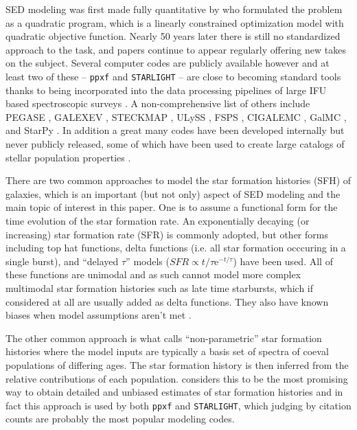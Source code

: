 \documentclass[modern]{aastex62}
\begin{document}
SED modeling was first made fully quantitative by \citet{1972A&A....20..361F} who formulated the problem as a quadratic program, which is a linearly constrained optimization model with quadratic objective function. Nearly 50 years later there is still no standardized approach to the task, and papers continue to appear regularly offering new takes on the subject. Several computer codes are publicly available however and at least two of these -- \texttt{ppxf} \citep{2004PASP..116..138C, 2017MNRAS.466..798C} and \texttt{STARLIGHT} \citep{2005MNRAS.358..363C} -- are close to becoming standard tools thanks to being incorporated into the data processing pipelines of large IFU based spectroscopic surveys \citep{2016AJ....152...83L, fernandes_et_al._2014}. A non-comprehensive list of others include PEGASE \citep{1997A&A...326..950F, 1999astro.ph.12179F}, GALEXEV \citep{2003MNRAS.344.1000B}, STECKMAP \citep{2006MNRAS.365...46O, 2006MNRAS.365...74O, 2011arXiv1108.4631O}, ULySS \citep{2009A&A...501.1269K}, FSPS \citep{2009ApJ...699..486C, 2010ApJ...712..833C}, CIGALEMC \citep{2011ApJ...740...22S}, GalMC \citep{2011ApJ...737...47A}, and StarPy \citep{2016ascl.soft09002S, 2015MNRAS.450..435S}. In addition a great many codes have been developed internally but never publicly released, some of which have been used to create large catalogs of stellar population properties \citep{2004astro.ph..6220B, 2007MNRAS.381.1252T, 2009ApJS..185....1T}.

There are two common approaches to model the star formation histories (SFH) of galaxies, which is an important (but not only) aspect of SED modeling and the main topic of interest in this paper. One is to assume a functional form for the time evolution of the star formation rate. An exponentially decaying (or increasing) star formation rate (SFR) is commonly adopted, but other forms including top hat functions, delta functions (i.e. all star formation occcuring in a single burst), and ``delayed $\tau$'' models ($SFR \propto t/\tau \mathrm{e}^{-t/\tau}$) have been used. All of these functions are unimodal and as such cannot model more complex multimodal star formation histories such as late time starbursts, which if considered at all are usually added as delta functions. They also have known biases when model assumptions aren't met \citep{2009ApJS..184..100L}. 

The other common approach is what \citet{2013ARA&A..51..393C} calls ``non-parametric'' star formation histories where the model inputs are typically a basis set of spectra of coeval populations of differing ages. The star formation history is then inferred from the relative contributions of each population. \citet{2013ARA&A..51..393C} considers this to be the most promising way to obtain detailed and unbiased estimates of star formation histories and in fact this approach is used by both \texttt{ppxf} and \texttt{STARLIGHT}, which judging by citation counts are probably the most popular modeling codes.
\end{document}
